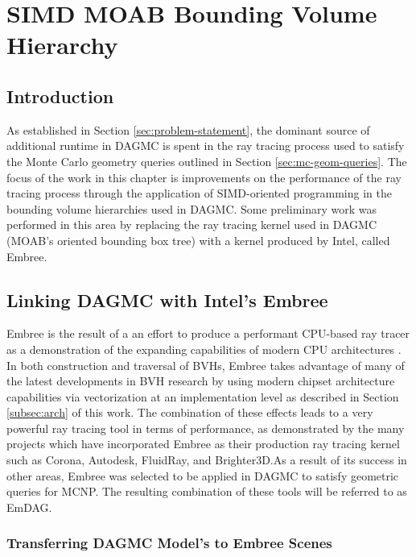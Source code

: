 
\chapter{SIMD MOAB Bounding Volume Hierarchy}\label{ch:simd_bvh}


\section{Introduction}

As established in Section \ref{sec:problem-statement}, the dominant source of
additional runtime in DAGMC is spent in the ray tracing process used to satisfy
the Monte Carlo geometry queries outlined in Section \ref{sec:mc-geom-queries}.
The focus of the work in this chapter is improvements on the performance of the
ray tracing process through the application of SIMD-oriented programming in the
bounding volume hierarchies used in DAGMC. Some preliminary work was performed
in this area by replacing the ray tracing kernel used in DAGMC (MOAB's oriented
bounding box tree) with a kernel produced by Intel, called Embree.

\section{Linking DAGMC with Intel's Embree}\label{sec:embree}

Embree is the result of a an effort to produce a performant CPU-based ray tracer
as a demonstration of the expanding capabilities of modern CPU architectures
\cite{Wald_2014}. In both construction and traversal of BVHs, Embree takes
advantage of many of the latest developments in BVH research by using modern
chipset architecture capabilities via vectorization at an implementation level
as described in Section \ref{subsec:arch} of this work. The combination of these
effects leads to a very powerful ray tracing tool in terms of performance, as
demonstrated by the many projects which have incorporated Embree as their
production ray tracing kernel such as Corona, Autodesk, FluidRay, and
Brighter3D.As a result of its success in other areas, Embree was selected to be
applied in DAGMC to satisfy geometric queries for MCNP. The resulting
combination of these tools will be referred to as EmDAG.

\subsection{Transferring DAGMC Model's to Embree Scenes}%

